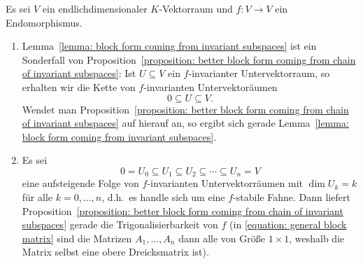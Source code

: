 \begin{example}
  Es sei $V$ ein endlichdimensionaler $K$-Vektorraum und $f \colon V \to V$ ein Endomorphismus.
  \begin{enumerate}
    \item
      Lemma~\ref{lemma: block form coming from invariant subspaces} ist ein Sonderfall von Proposition~\ref{proposition: better block form coming from chain of invariant subspaces}:
      Ist $U \subseteq V$ ein $f$-invarianter Untervektorraum, so erhalten wir die Kette von $f$-invarianten Untervektoräumen
      \[
                  0
        \subseteq U
        \subseteq V.
      \]
      Wendet man Proposition~\ref{proposition: better block form coming from chain of invariant subspaces} auf hierauf an, so ergibt sich gerade Lemma~\ref{lemma: block form coming from invariant subspaces}.
    \item
      Es sei
      \[
                  0
        =         U_0
        \subseteq U_1
        \subseteq U_2
        \subseteq \dotsb
        \subseteq U_n
        =         V
      \]
      eine aufsteigende Folge von $f$-invarianten Untervektorräumen mit $\dim U_k = k$ für alle $k = 0, \dotsc, n$, d.h.\ es handle sich um eine $f$-stabile Fahne.
      Dann liefert Proposition~\ref{proposition: better block form coming from chain of invariant subspaces} gerade die Trigonalisierbarkeit von $f$ (in \eqref{equation: general block matrix} sind die Matrizen $A_1, \dotsc, A_n$ dann alle von Größe $1 \times 1$, weshalb die Matrix selbst eine obere Dreicksmatrix ist).
  \end{enumerate}
\end{example}
